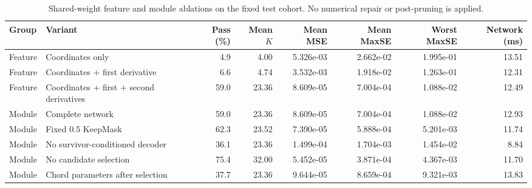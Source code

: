 \begin{table}[t]
\centering
\caption{Shared-weight feature and module ablations on the fixed test cohort. No numerical repair or post-pruning is applied.}
\label{tab:paired-ablation}
\begin{tabular}{llrrrrrr}
\toprule
Group & Variant & Pass (\%) & Mean $K$ & Mean MSE & Mean MaxSE & Worst MaxSE & Network (ms)\\
\midrule
Feature & Coordinates only & 4.9 & 4.00 & 5.326e-03 & 2.662e-02 & 1.995e-01 & 13.51\\
Feature & Coordinates $+$ first derivative & 6.6 & 4.74 & 3.532e-03 & 1.918e-02 & 1.263e-01 & 12.31\\
Feature & Coordinates $+$ first $+$ second derivatives & 59.0 & 23.36 & 8.609e-05 & 7.004e-04 & 1.088e-02 & 12.49\\
Module & Complete network & 59.0 & 23.36 & 8.609e-05 & 7.004e-04 & 1.088e-02 & 12.93\\
Module & Fixed $0.5$ KeepMask & 62.3 & 23.52 & 7.390e-05 & 5.888e-04 & 5.201e-03 & 11.74\\
Module & No survivor-conditioned decoder & 36.1 & 23.36 & 1.499e-04 & 1.704e-03 & 1.454e-02 & 8.84\\
Module & No candidate selection & 75.4 & 32.00 & 5.452e-05 & 3.871e-04 & 4.367e-03 & 11.70\\
Module & Chord parameters after selection & 37.7 & 23.36 & 9.644e-05 & 8.659e-04 & 9.321e-03 & 13.83\\
\bottomrule
\end{tabular}
\end{table}
